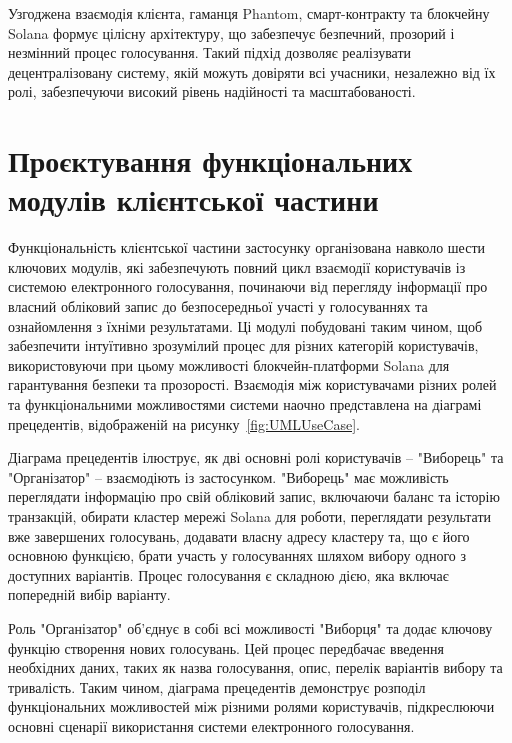 \documentclass[14pt]{extreport}
\begin{document}
  Узгоджена взаємодія клієнта, гаманця Phantom, смарт-контракту та блокчейну Solana формує цілісну архітектуру, що забезпечує безпечний, прозорий і незмінний процес голосування. Такий підхід дозволяє реалізувати децентралізовану систему, якій можуть довіряти всі учасники, незалежно від їх ролі, забезпечуючи високий рівень надійності та масштабованості.
  
  \section{Проєктування функціональних модулів клієнтської частини}
  
  Функціональність клієнтської частини застосунку організована навколо шести ключових модулів, які забезпечують повний цикл взаємодії користувачів із системою електронного голосування, починаючи від перегляду інформації про власний обліковий запис до безпосередньої участі у голосуваннях та ознайомлення з їхніми результатами. Ці модулі побудовані таким чином, щоб забезпечити інтуїтивно зрозумілий процес для різних категорій користувачів, використовуючи при цьому можливості блокчейн-платформи Solana для гарантування безпеки та прозорості. Взаємодія між користувачами різних ролей та функціональними можливостями системи наочно представлена на діаграмі прецедентів, відображеній на рисунку~\ref{fig:UMLUseCase}.

Діаграма прецедентів ілюструє, як дві основні ролі користувачів – "Виборець" та "Організатор" – взаємодіють із застосунком. "Виборець" має можливість переглядати інформацію про свій обліковий запис, включаючи баланс та історію транзакцій, обирати кластер мережі Solana для роботи, переглядати результати вже завершених голосувань, додавати власну адресу кластеру та, що є його основною функцією, брати участь у голосуваннях шляхом вибору одного з доступних варіантів. Процес голосування є складною дією, яка включає попередній вибір варіанту.

Роль "Організатор" об'єднує в собі всі можливості "Виборця" та додає ключову функцію створення нових голосувань. Цей процес передбачає введення необхідних даних, таких як назва голосування, опис, перелік варіантів вибору та тривалість. Таким чином, діаграма прецедентів демонструє розподіл функціональних можливостей між різними ролями користувачів, підкреслюючи основні сценарії використання системи електронного голосування.
\end{document}
